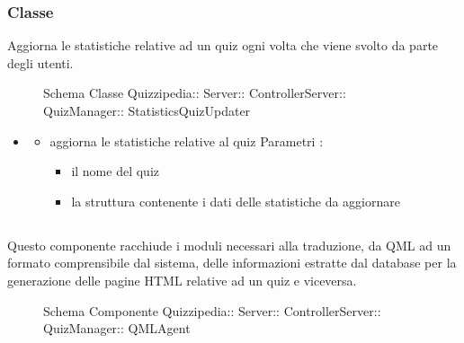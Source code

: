 \subsubsection{Classe }
Aggiorna le statistiche relative ad un quiz ogni volta che viene svolto da parte degli utenti.
\begin{figure}[H]
\centering
\noindent{}
\caption[Schema Classe StatisticsQuizUpdater]{Schema Classe Quizzipedia:: Server:: ControllerServer:: QuizManager:: StatisticsQuizUpdater}
\end{figure}
\begin{itemize}
\item {}
\begin{itemize}
\item {}
\newline
aggiorna le statistiche relative al quiz
\newline
Parametri :
\begin{itemize}
\item {}
\newline
il nome del quiz
\item {}
\newline
la struttura contenente i dati delle statistiche da aggiornare
\end{itemize}
\end{itemize}
\end{itemize}
\subsection{}
Questo componente racchiude i moduli necessari alla traduzione, da QML ad un formato comprensibile dal sistema, delle informazioni estratte dal database per la generazione delle pagine HTML relative ad un quiz e viceversa.
\begin{figure}[H]
\centering
\noindent{}
\caption[Schema Componente QMLAgent]{Schema Componente Quizzipedia:: Server:: ControllerServer:: QuizManager:: QMLAgent}
\end{figure}

